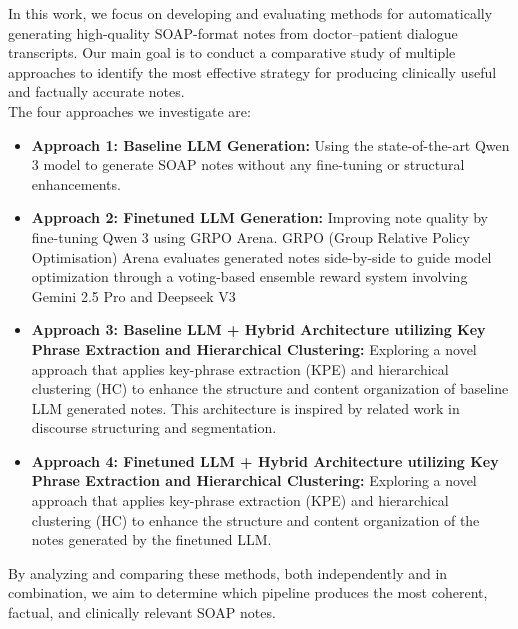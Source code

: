\documentclass[11pt,a4paper]{article}
\begin{document}
In this work, 
we focus on developing and evaluating methods for automatically generating high-quality SOAP-format notes from doctor–patient dialogue transcripts. Our main goal is to conduct a comparative study of multiple approaches to identify the most effective strategy for producing clinically useful and factually accurate notes.\\The four approaches we investigate are:
\begin{itemize}
    \item \textbf{Approach 1: Baseline LLM Generation:} Using the state-of-the-art Qwen 3 model to generate SOAP notes without any fine-tuning or structural enhancements.
    \item \textbf{Approach 2: Finetuned LLM Generation:} Improving note quality by fine-tuning Qwen 3 using GRPO Arena. GRPO (Group Relative Policy Optimisation)  Arena evaluates generated notes side-by-side to guide model optimization through a voting-based ensemble reward system involving Gemini 2.5 Pro and Deepseek V3
    \item \textbf{Approach 3: Baseline LLM + Hybrid Architecture utilizing Key Phrase Extraction and Hierarchical Clustering:} Exploring a novel approach that applies key-phrase extraction (KPE) and hierarchical clustering (HC) to enhance the structure and content organization of baseline LLM generated notes. This architecture is inspired by related work in discourse structuring and segmentation.
    \item \textbf{Approach 4: Finetuned LLM + Hybrid Architecture utilizing Key Phrase Extraction and Hierarchical Clustering:} Exploring a novel approach that applies key-phrase extraction (KPE) and hierarchical clustering (HC) to enhance the structure and content organization of the notes generated by the finetuned LLM. 
    
\end{itemize}
By analyzing and comparing these methods, both independently and in combination, we aim to determine which pipeline produces the most coherent, factual, and clinically relevant SOAP notes. 
\end{document}
